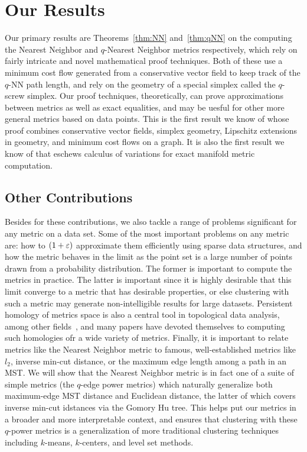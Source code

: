 \section{Our Results}
Our primary results are Theorems~\ref{thm:NN} and~\ref{thm:qNN} on the
computing the Nearest Neighbor and $q$-Nearest Neighbor metrics
respectively, which rely
on fairly intricate and novel mathematical proof techniques. Both of these
use a minimum cost flow generated from a conservative vector field to keep
track of the $q$-NN path length, and rely on the geometry of a special
simplex called the
$q$-screw simplex. Our proof techniques, theoretically, can prove
approximations between metrics as well as exact equalities, and may be
uesful for other more general metrics based on data points. This is the
first result we know of whose proof combines
conservative vector fields, simplex geometry, Lipschitz extensions in
geometry, and minimum cost flows on a graph. It is also the first result we
know of that eschews calculus of variations for exact manifold metric
computation.

\subsection{Other Contributions}
Besides for these contributions, we also tackle a range of problems
significant for any metric on a data set.  Some of the most important
problems on any metric are: how to $(1+\varepsilon)$ approximate them efficiently
using sparse data structures, and how the metric behaves in the limit as
the point set is a large number of points drawn from a probability
distribution. The former is important to compute the metrics in practice.
The latter is important since it is highly desirable that
this limit converge to a metric that has desirable properties, or else
clustering with such a metric may generate non-intelligible results for
large datasets.  Persistent homology of metrics space is also a central
tool in topological data analysis, among other fields~\cite{}, and many
papers have devoted themselves to computing such homologies ofr a wide
variety of metrics. Finally, it is important to relate metrics
like the Nearest Neighbor metric to famous, well-established metrics like
$l_2$, inverse min-cut distance, or
the maximum edge length among a path in an MST.
We will show that the
Nearest Neighbor metric is in fact one of a suite of simple metrics (the
$q$-edge power metrics) which naturally generalize both maximum-edge MST
distance and Euclidean distance, the latter of which covers inverse min-cut
idstances via the Gomory Hu tree.  This helps put our metrics in a broader
and more interpretable context, and ensures that clustering with these
$q$-power metrics is a generalization of more traditional clustering
techniques including $k$-means, $k$-centers, and level set methods.

